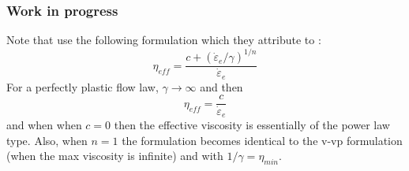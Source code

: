 \subsubsection{Work in progress}

\Literature \cite{zico74,zigo74,zico74b,zien75,corm75,zigo75,zihl75,zijo78,vidm82,vidm84,vede84,zivt85,vimd86}
\cite{wasd97,debo88,debo01,hesd02,bewv11,mumg10,leor89,sccm13,desm93,demu92,debo91,shmv16}
\cite{modm01}\cite{baji02}\cite{slde92}
\cite{modm02}

Note that \cite{vidm82,vidm84,vimd86,zivt85} use the following formulation which they attribute to \cite{zijo78}:
\[
\eta_{eff} = \frac{c + (\dot{\varepsilon}_e / \gamma)^{1/n}}{ \dot{\varepsilon}_e }
\] 
For a perfectly plastic flow law, $\gamma \rightarrow \infty$ and then 
\[
\eta_{eff} = \frac{c}{ \dot{\varepsilon}_e }
\] 
and when when $c=0$ then the effective viscosity is essentially of the power law type.
Also, when $n=1$ the formulation becomes identical to the v-vp formulation (when the max viscosity is infinite) and with $1/\gamma=\eta_{min}$.





